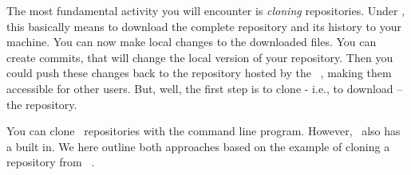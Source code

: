 %
\label{sec:gitClone}%
%
The most fundamental activity you will encounter is \emph{cloning} repositories.
Under \git, this basically means to download the complete repository and its history to your machine.
You can now make local changes to the downloaded files.
You can create commits, that will change the local version of your repository.
Then you could push these changes back to the repository hosted by the \git\ , making them accessible for other users.
But, well, the first step is to clone - i.e., to download -- the repository.

You can clone \git\ repositories with the command line   program.
However, \pycharm\ also has a \git {} built in.
We here outline both approaches based on the example of cloning a repository from \github~\cite{GH2025RD:CAR}.%
%
%
%
%
\endhsection%
